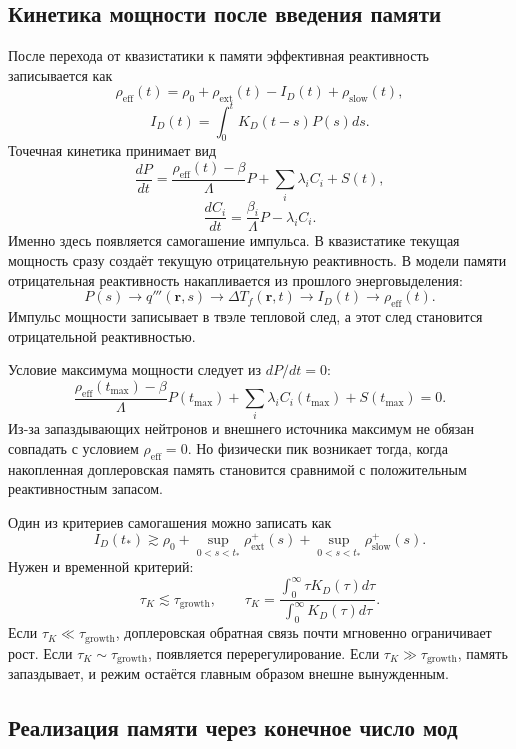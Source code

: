 \documentclass[12pt]{article}
\begin{document}
\subsection{Кинетика мощности после введения памяти}

После перехода от квазистатики к памяти эффективная реактивность записывается как
\[
\rho_{\mathrm{eff}}(t)
=
\rho_0+
\rho_{\mathrm{ext}}(t)-I_D(t)+\rho_{\mathrm{slow}}(t),
\]
\[
I_D(t)=\int_0^tK_D(t-s)P(s)ds.
\]
Точечная кинетика принимает вид
\[
\frac{dP}{dt}
=
\frac{\rho_{\mathrm{eff}}(t)-\beta}{\Lambda}P
+
\sum_i\lambda_iC_i+S(t),
\]
\[
\frac{dC_i}{dt}
=
\frac{\beta_i}{\Lambda}P-
\lambda_iC_i.
\]
Именно здесь появляется самогашение импульса. В квазистатике текущая мощность сразу создаёт текущую отрицательную реактивность. В модели памяти отрицательная реактивность накапливается из прошлого энерговыделения:
\[
P(s)
\rightarrow
q'''(\mathbf r,s)
\rightarrow
\Delta T_f(\mathbf r,t)
\rightarrow
I_D(t)
\rightarrow
\rho_{\mathrm{eff}}(t).
\]
Импульс мощности записывает в твэле тепловой след, а этот след становится отрицательной реактивностью.

Условие максимума мощности следует из \(dP/dt=0\):
\[
\frac{\rho_{\mathrm{eff}}(t_{\max})-\beta}{\Lambda}P(t_{\max})
+
\sum_i\lambda_iC_i(t_{\max})+S(t_{\max})=0.
\]
Из-за запаздывающих нейтронов и внешнего источника максимум не обязан совпадать с условием \(\rho_{\mathrm{eff}}=0\). Но физически пик возникает тогда, когда накопленная доплеровская память становится сравнимой с положительным реактивностным запасом.

Один из критериев самогашения можно записать как
\[
\boxed{
I_D(t_*)
\gtrsim
\rho_0+
\sup_{0<s<t_*}\rho_{\mathrm{ext}}^+(s)+
\sup_{0<s<t_*}\rho_{\mathrm{slow}}^+(s).
}
\]
Нужен и временной критерий:
\[
\tau_K\lesssim\tau_{\mathrm{growth}},
\qquad
\tau_K=
\frac{\int_0^\infty\tau K_D(\tau)d\tau}{\int_0^\infty K_D(\tau)d\tau}.
\]
Если \(\tau_K\ll\tau_{\mathrm{growth}}\), доплеровская обратная связь почти мгновенно ограничивает рост. Если \(\tau_K\sim\tau_{\mathrm{growth}}\), появляется перерегулирование. Если \(\tau_K\gg\tau_{\mathrm{growth}}\), память запаздывает, и режим остаётся главным образом внешне вынужденным.

\subsection{Реализация памяти через конечное число мод}
\end{document}
